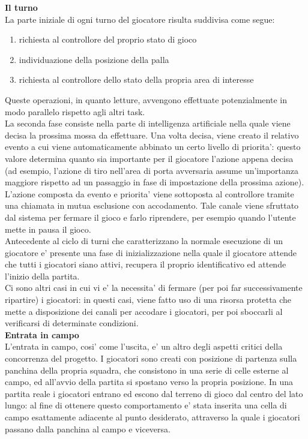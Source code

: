 \textbf{Il turno}\\

La parte iniziale di ogni turno del giocatore risulta suddivisa come segue:

\begin{enumerate}
	\item richiesta al controllore del proprio stato di gioco
	\item individuazione della posizione della palla
	\item richiesta al controllore dello stato della propria area di interesse
\end{enumerate}

Queste operazioni, in quanto letture, avvengono effettuate potenzialmente in modo parallelo rispetto agli altri task.\\

La seconda fase consiste nella parte di intelligenza artificiale nella quale viene decisa la prossima mossa da effettuare. Una volta decisa, viene creato il relativo evento a cui viene automaticamente abbinato un certo livello di priorita': questo valore determina quanto sia importante per il giocatore l'azione appena decisa (ad esempio, l'azione di tiro nell'area di porta avversaria assume un'importanza maggiore rispetto ad un passaggio in fase di impostazione della prossima azione). L'azione composta da evento e priorita' viene sottoposta al controllore tramite una chiamata in mutua esclusione con accodamento. Tale canale viene sfruttato dal sistema per fermare il gioco e farlo riprendere, per esempio quando l'utente mette in pausa il gioco.\\

Antecedente al ciclo di turni che caratterizzano la normale esecuzione di un giocatore e' presente una fase di inizializzazione nella quale il giocatore attende che tutti i giocatori siano attivi, recupera il proprio identificativo ed attende l'inizio della partita.\\

Ci sono altri casi in cui vi e' la necessita' di fermare (per poi far successivamente ripartire) i giocatori: in questi casi, viene fatto uso di una risorsa protetta che mette a disposizione dei canali per accodare i giocatori, per poi sboccarli al verificarsi di determinate condizioni.\\

\textbf{Entrata in campo}\\

L'entrata in campo, cosi' come l'uscita, e' un altro degli aspetti critici della concorrenza del progetto. I giocatori sono creati con posizione di partenza sulla panchina della propria squadra, che consistono in una serie di celle esterne al campo, ed all'avvio della partita si spostano verso la propria posizione. In una partita reale i giocatori entrano ed escono dal terreno di gioco dal centro del lato lungo: al fine di ottenere questo comportamento e' stata inserita una cella di campo esattamente adiacente al punto desiderato, attraverso la quale i giocatori passano dalla panchina al campo e viceversa.\\

